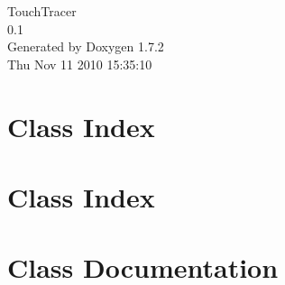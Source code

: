 \documentclass[a4paper]{book}
\begin{document}
\hypersetup{pageanchor=false}
\begin{titlepage}
\vspace*{7cm}
\begin{center}
{\Large TouchTracer \\[1ex]\large 0.1 }\\
\vspace*{1cm}
{\large Generated by Doxygen 1.7.2}\\
\vspace*{0.5cm}
{\small Thu Nov 11 2010 15:35:10}\\
\end{center}
\end{titlepage}
\clearemptydoublepage
{}
\tableofcontents
\clearemptydoublepage
{}
\hypersetup{pageanchor=true}
\chapter{Class Index}

\chapter{Class Index}

\chapter{Class Documentation}


















\printindex
\end{document}
